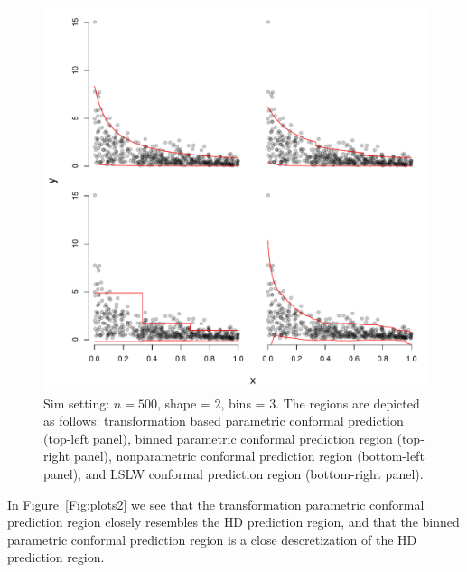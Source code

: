 \documentclass[11pt]{article}\usepackage[]{graphicx}\usepackage[]{color}
\makeatletter
\def\maxwidth{ %
  \ifdim\Gin@nat@width>\linewidth
    \linewidth
  \else
    \Gin@nat@width
  \fi
}
\newenvironment{knitrout}{}{} %
\makeatother
\begin{document}
\begin{figure}[h!]
\begin{center}
\begin{knitrout}
\color{fgcolor}
\includegraphics[width=\maxwidth]{figure/gammasimexample-1} 

\end{knitrout}
\end{center}
\caption{Sim setting: $n = 500$, shape = $2$, bins = $3$. 
  The regions are depicted as follows: 
    transformation based parametric conformal prediction (top-left panel),
    binned parametric conformal prediction region (top-right panel),
    nonparametric conformal prediction region (bottom-left panel), and 
    LSLW conformal prediction region (bottom-right panel).}
\label{Fig:plots}
\end{figure}

In Figure~\ref{Fig:plots2} we see that the transformation parametric conformal 
prediction region closely resembles the HD prediction region, and that the 
binned parametric conformal prediction region is a close descretization of 
the HD prediction region.
\end{document}
